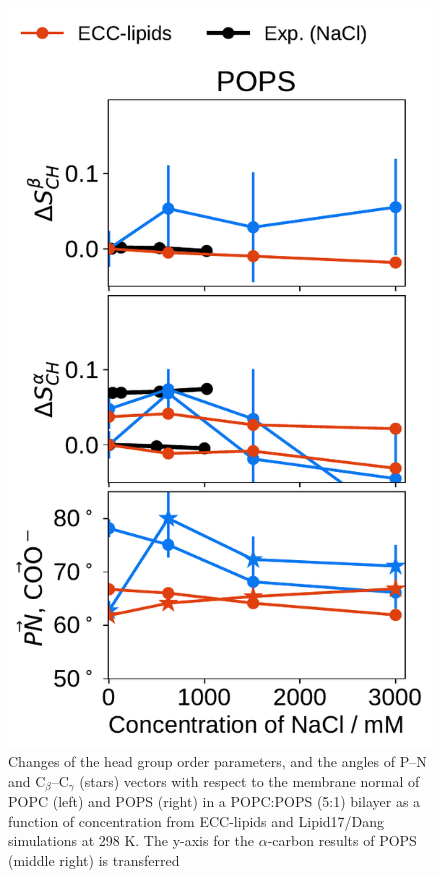 \documentclass[journal=jpcbfk,manuscript=article]{achemso}
\newlength{\figheight}
\begin{document}
\begin{figure}[tbp!]
  \includegraphics[height=\figheight]{../img/ecc_pops/order_parameters_changes_ecc-lip_L14_A-B-PN-COO_POPS_nacl.pdf} 
  \caption{\label{fig:delta_ordPar_NaCl_PCPS} 
    Changes of the head group order parameters, and the angles of P--N and C$_\beta$--C$_\gamma$ (stars) vectors
    with respect to the membrane normal of POPC (left) and POPS (right) in a POPC:POPS (5:1) bilayer 
    as a function of  concentration from ECC-lipids and Lipid17/Dang simulations at 298 K.
    The y-axis for the $\alpha$-carbon results of POPS (middle right) is transferred
}
\end{figure}
\end{document}
